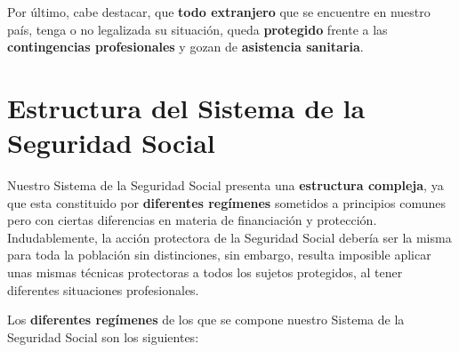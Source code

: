 Por último, cabe destacar, que \textbf{todo extranjero} que se encuentre en nuestro país, tenga o no legalizada su situación, queda \textbf{protegido} frente a las \textbf{contingencias profesionales} y gozan de \textbf{asistencia sanitaria}.

\section{Estructura del Sistema de la Seguridad Social}
Nuestro Sistema de la Seguridad Social presenta una \textbf{estructura compleja}, ya que esta constituido por \textbf{diferentes regímenes} sometidos a principios comunes pero con ciertas diferencias en materia de financiación y protección. Indudablemente, la acción protectora de la Seguridad Social debería ser la misma para toda la población sin distinciones, sin embargo, resulta imposible aplicar unas mismas técnicas protectoras a todos los sujetos protegidos, al tener diferentes situaciones profesionales.

Los \textbf{diferentes regímenes} de los que se compone nuestro Sistema de la Seguridad Social son los siguientes:

